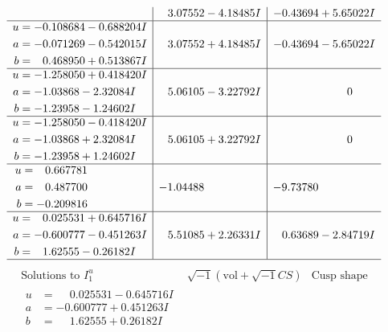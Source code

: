 \documentclass[1p]{elsarticle_modified}
\theoremstyle{definition}
\newcommand{\I}{\sqrt{-1}}
\begin{document}
$$\begin{array}{c|c|c}
 & \phantom{-}3.07552 - 4.18485 I & -0.43694 + 5.65022 I \\ \hline\begin{aligned}
u &= -0.108684 - 0.688204 I \\
a &= -0.071269 - 0.542015 I \\
b &= \phantom{-}0.468950 + 0.513867 I\end{aligned}
 & \phantom{-}3.07552 + 4.18485 I & -0.43694 - 5.65022 I \\ \hline\begin{aligned}
u &= -1.258050 + 0.418420 I \\
a &= -1.03868 - 2.32084 I \\
b &= -1.23958 - 1.24602 I\end{aligned}
 & \phantom{-}5.06105 - 3.22792 I & \phantom{-0.000000 } 0 \\ \hline\begin{aligned}
u &= -1.258050 - 0.418420 I \\
a &= -1.03868 + 2.32084 I \\
b &= -1.23958 + 1.24602 I\end{aligned}
 & \phantom{-}5.06105 + 3.22792 I & \phantom{-0.000000 } 0 \\ \hline\begin{aligned}
u &= \phantom{-}0.667781\phantom{ +0.000000I} \\
a &= \phantom{-}0.487700\phantom{ +0.000000I} \\
b &= -0.209816\phantom{ +0.000000I}\end{aligned}
 & -1.04488\phantom{ +0.000000I} & -9.73780\phantom{ +0.000000I} \\ \hline\begin{aligned}
u &= \phantom{-}0.025531 + 0.645716 I \\
a &= -0.600777 - 0.451263 I \\
b &= \phantom{-}1.62555 - 0.26182 I\end{aligned}
 & \phantom{-}5.51085 + 2.26331 I & \phantom{-}0.63689 - 2.84719 I\\
 \hline 
 \end{array}$$\newpage$$\begin{array}{c|c|c}  
\text{Solutions to }I^u_{1}& \I (\text{vol} + \sqrt{-1}CS) & \text{Cusp shape}\\
 \hline 
\begin{aligned}
u &= \phantom{-}0.025531 - 0.645716 I \\
a &= -0.600777 + 0.451263 I \\
b &= \phantom{-}1.62555 + 0.26182 I\end{aligned}

\end{array}$$
\end{document}
